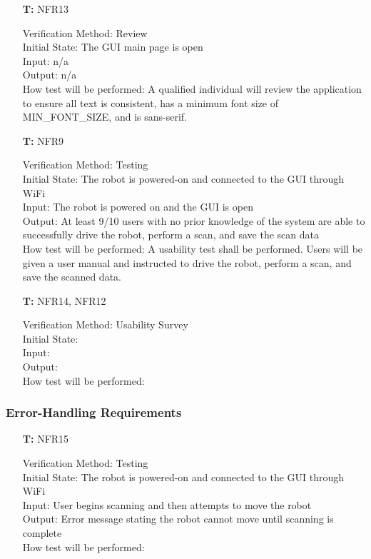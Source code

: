 \documentclass[12pt, titlepage]{article}
\newcounter{tnum} %
\begin{document}
\begin{itemize}
\item[\textbf{T\refstepcounter{tnum}\thetnum:}]{NFR13\\}

Verification Method: Review\\					
Initial State: The GUI main page is open\\			
Input: n/a\\
Output: n/a\\
How test will be performed: A qualified individual will review the application to ensure all text is consistent, has a minimum font size of MIN\_FONT\_SIZE, and is sans-serif. \\

\item[\textbf{T\refstepcounter{tnum}\thetnum:}]{NFR9\\}

Verification Method: Testing\\					
Initial State: The robot is powered-on and connected to the GUI through WiFi\\			
Input: The robot is powered on and the GUI is open\\
Output: At least 9/10 users with no prior knowledge of the system are able to successfully drive the robot, perform a scan, and save the scan data\\
How test will be performed: A usability test shall be performed. Users will be given a user manual and instructed to drive the robot, perform a scan, and save the scanned data.\\ 

\item[\textbf{T\refstepcounter{tnum}\thetnum:}]{NFR14, NFR12\\}

Verification Method: Usability Survey\\					
Initial State: 		\\
Input: \\
Output: \\
How test will be performed:\\

\end{itemize}

\subsubsection{Error-Handling Requirements}

\begin{itemize}

\item[\textbf{T\refstepcounter{tnum}\thetnum:}]{NFR15\\}

Verification Method: Testing\\					
Initial State: 	The robot is powered-on and connected to the GUI through WiFi	\\
Input: User begins scanning and then attempts to move the robot\\
Output: Error message stating the robot cannot move until scanning is complete\\
How test will be performed:

\end{itemize}
\end{document}
